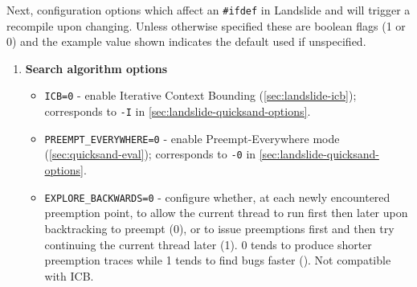 Next, configuration options which affect an {\tt \#ifdef} in Landslide and will trigger a recompile upon changing.
Unless otherwise specified these are boolean flags (1 or 0) and the example value shown indicates the default used if unspecified.

\begin{enumerate}
\item {\bf Search algorithm options}
\begin{itemize}
	\item {\tt ICB=0} - enable Iterative Context Bounding (\cref{sec:landslide-icb});
		corresponds to {\tt -I} in \cref{sec:landslide-quicksand-options}.
	\item {\tt PREEMPT\_EVERYWHERE=0} - enable Preempt-Everywhere mode (\cref{sec:quicksand-eval});
		corresponds to {\tt -0} in \cref{sec:landslide-quicksand-options}.
	\item {\tt EXPLORE\_BACKWARDS=0} - configure whether, at each newly encountered preemption point,
		to allow the current thread to run first then later upon backtracking to preempt (0),
		or to issue preemptions first and then try continuing the current thread later (1).
		0 tends to produce shorter preemption traces while 1 tends to find bugs faster (\cite[\S{}8.7.1]{landslide}).
		Not compatible with ICB.
\end{itemize}


\end{enumerate}

